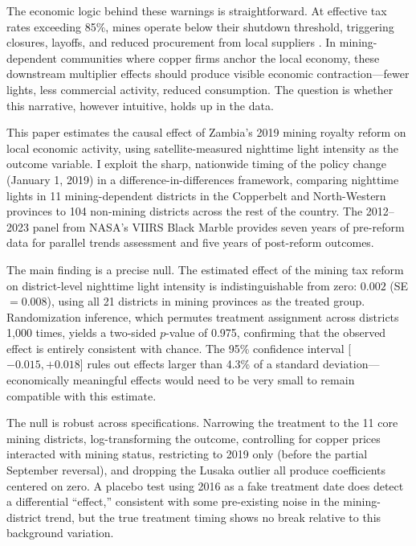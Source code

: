 \documentclass[12pt]{article}
\begin{document}
The economic logic behind these warnings is straightforward. At effective tax rates exceeding 85\%, mines operate below their shutdown threshold, triggering closures, layoffs, and reduced procurement from local suppliers \citep{tilton2018mineral}. In mining-dependent communities where copper firms anchor the local economy, these downstream multiplier effects should produce visible economic contraction---fewer lights, less commercial activity, reduced consumption. The question is whether this narrative, however intuitive, holds up in the data.

This paper estimates the causal effect of Zambia's 2019 mining royalty reform on local economic activity, using satellite-measured nighttime light intensity as the outcome variable. I exploit the sharp, nationwide timing of the policy change (January 1, 2019) in a difference-in-differences framework, comparing nighttime lights in 11 mining-dependent districts in the Copperbelt and North-Western provinces to 104 non-mining districts across the rest of the country. The 2012--2023 panel from NASA's VIIRS Black Marble provides seven years of pre-reform data for parallel trends assessment and five years of post-reform outcomes.

The main finding is a precise null. The estimated effect of the mining tax reform on district-level nighttime light intensity is indistinguishable from zero: $0.002$ (SE $= 0.008$), using all 21 districts in mining provinces as the treated group. Randomization inference, which permutes treatment assignment across districts 1,000 times, yields a two-sided $p$-value of 0.975, confirming that the observed effect is entirely consistent with chance. The 95\% confidence interval [$-0.015, +0.018$] rules out effects larger than 4.3\% of a standard deviation---economically meaningful effects would need to be very small to remain compatible with this estimate.

The null is robust across specifications. Narrowing the treatment to the 11 core mining districts, log-transforming the outcome, controlling for copper prices interacted with mining status, restricting to 2019 only (before the partial September reversal), and dropping the Lusaka outlier all produce coefficients centered on zero. A placebo test using 2016 as a fake treatment date does detect a differential ``effect,'' consistent with some pre-existing noise in the mining-district trend, but the true treatment timing shows no break relative to this background variation.
\end{document}
